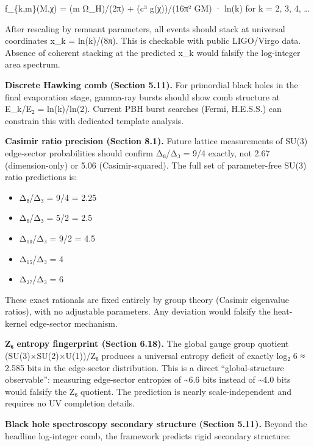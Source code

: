 \documentclass[
]{article}
\providecommand{\tightlist}{%
  \setlength{\itemsep}{0pt}\setlength{\parskip}{0pt}}
\begin{document}
f\_\{k,m\}(M,χ) = (m Ω\_H)/(2π) + (c³ g(χ))/(16π² GM) · ln(k) for k = 2,
3, 4, \ldots{}

After rescaling by remnant parameters, all events should stack at
universal coordinates x\_k = ln(k)/(8π). This is checkable with public
LIGO/Virgo data. Absence of coherent stacking at the predicted x\_k
would falsify the log-integer area spectrum.

\textbf{Discrete Hawking comb (Section 5.11).} For primordial black
holes in the final evaporation stage, gamma-ray bursts should show comb
structure at E\_k/E₂ = ln(k)/ln(2). Current PBH burst searches (Fermi,
H.E.S.S.) can constrain this with dedicated template analysis.

\textbf{Casimir ratio precision (Section 8.1).} Future lattice
measurements of SU(3) edge-sector probabilities should confirm Δ₈/Δ₃ =
9/4 exactly, not 2.67 (dimension-only) or 5.06 (Casimir-squared). The
full set of parameter-free SU(3) ratio predictions is:

\begin{itemize}
\tightlist
\item
  Δ₈/Δ₃ = 9/4 = 2.25
\item
  Δ₆/Δ₃ = 5/2 = 2.5
\item
  Δ₁₀/Δ₃ = 9/2 = 4.5
\item
  Δ₁₅/Δ₃ = 4
\item
  Δ₂₇/Δ₃ = 6
\end{itemize}

These exact rationals are fixed entirely by group theory (Casimir
eigenvalue ratios), with no adjustable parameters. Any deviation would
falsify the heat-kernel edge-sector mechanism.

\textbf{Z₆ entropy fingerprint (Section 6.18).} The global gauge group
quotient (SU(3)×SU(2)×U(1))/Z₆ produces a universal entropy deficit of
exactly log₂ 6 ≈ 2.585 bits in the edge-sector distribution. This is a
direct ``global-structure observable'': measuring edge-sector entropies
of \textasciitilde6.6 bits instead of \textasciitilde4.0 bits would
falsify the Z₆ quotient. The prediction is nearly scale-independent and
requires no UV completion details.

\textbf{Black hole spectroscopy secondary structure (Section 5.11).}
Beyond the headline log-integer comb, the framework predicts rigid
secondary structure:
\end{document}
